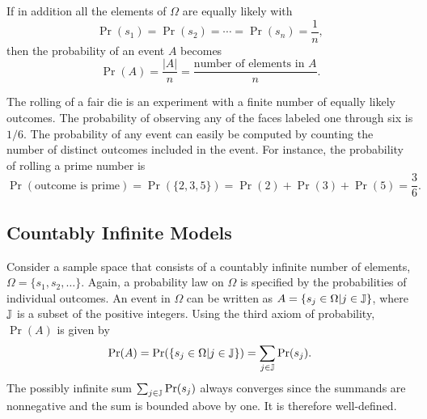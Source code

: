 If in addition all the elements of $\Omega$ are equally likely with
\begin{equation*}
\Pr (s_1) = \Pr (s_2) = \cdots = \Pr (s_n) = \frac{1}{n} ,
\end{equation*}
then the probability of an event $A$ becomes
\begin{equation} \label{equation:ProbEquiProbableOutcomes}
\Pr (A) = \frac{ |A| }{n}
= \frac{ \text{number of elements in $A$} }{n} .
\end{equation}

\begin{example}
The rolling of a fair die is an experiment with a finite number of equally likely outcomes.
The probability of observing any of the faces labeled one through six is $1/6$.
The probability of any event can easily be computed by counting the number of distinct outcomes included in the event.
For instance, the probability of rolling a prime number is
\begin{equation*}
\Pr (\text{outcome is prime})
= \Pr ( \{ 2, 3, 5 \} )
= \Pr (2) + \Pr(3) + \Pr(5) = \frac{3}{6} .
\end{equation*}
\end{example}


\subsection{Countably Infinite Models}

Consider a sample space that consists of a countably infinite number of elements, $\Omega = \{ s_1, s_2, \ldots \}$.
Again, a probability law on $\Omega$ is specified by the probabilities of individual outcomes.
An event in $\Omega$ can be written as $A = \{ s_j \in \Omega | j \in \mathbb{J} \}$, where $\mathbb{J}$ is a subset of the positive integers.
Using the third axiom of probability, $\Pr (A)$ is given by
\begin{equation*}
\Pr (A)
= \Pr ( \{ s_j \in \Omega | j \in \mathbb{J} \} )
= \sum_{j \in \mathbb{J}} \Pr (s_j) .
\end{equation*}
The possibly infinite sum $\sum_{j \in \mathbb{J}} \Pr (s_j)$ always converges since the summands are nonnegative and the sum is bounded above by one.
It is therefore well-defined.

